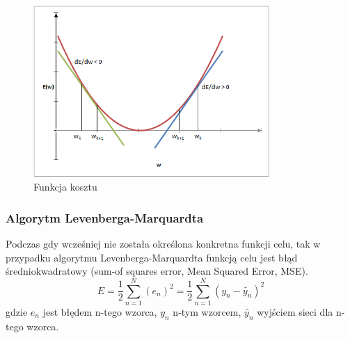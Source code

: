 \begin{figure}
	\centering
	\includegraphics[width=0.8\textwidth]{images/gradient.png}
	\caption{Funkcja kosztu}
	\label{fig:gradient}
\end{figure}

\subsubsection*{Algorytm Levenberga-Marquardta}
Podczas gdy wcześniej nie została określona konkretna funkcji celu, tak w przypadku algorytmu Levenberga-Marquardta funkcją celu jest błąd średniokwadratowy (sum-of squares error, Mean Squared Error, MSE)\cite{Bishop}.
\begin{equation}
	\label{wzor:mse}
	E = \frac{1}{2} \sum_{n=1}^N(e_n)^2 = \frac{1}{2} \sum_{n=1}^N(y_n - \tilde{y_n})^2
\end{equation}
gdzie $e_n$ jest błędem n-tego wzorca, $y_n$ n-tym wzorcem, $\tilde{y_n}$ wyjściem sieci dla n-tego wzorca.

